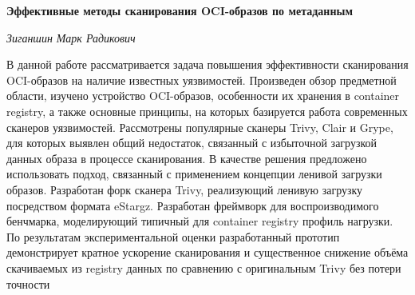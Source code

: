 \begin{center}
\textbf{Эффективные методы сканирования OCI-образов по метаданным}

\textit{Зиганшин Марк Радикович}
\end{center}

\vspace{0.7cm}

\begin{center}

В данной работе рассматривается задача повышения эффективности сканирования OCI-образов на наличие известных уязвимостей. Произведен обзор предметной области, изучено устройство OCI-образов, особенности их хранения в container registry, а также основные принципы, на которых базируется работа современных сканеров уязвимостей. Рассмотрены популярные сканеры Trivy, Clair и  Grype, для которых выявлен общий недостаток, связанный с избыточной загрузкой данных образа в процессе сканирования. В качестве решения предложено использовать подход, связанный с применением концепции ленивой загрузки образов. Разработан форк сканера Trivy, реализующий ленивую загрузку посредством формата eStargz. Разработан фреймворк для воспроизводимого бенчмарка, моделирующий типичный для container registry профиль нагрузки. По результатам экспериментальной оценки разработанный прототип демонстрирует кратное ускорение сканирования и существенное снижение объёма скачиваемых из registry данных по сравнению с оригинальным Trivy без потери точности

\end{center}

\newpage
